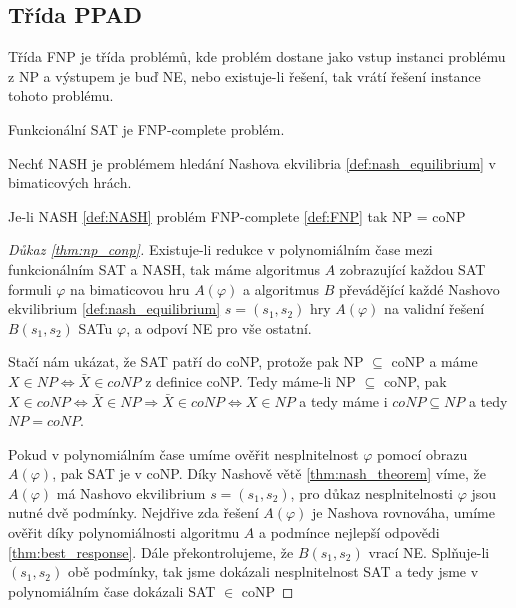 \subsection{Třída PPAD}
\begin{definition}
\label{def:FNP}
Třída FNP je třída problémů, kde problém dostane jako vstup instanci problému z NP a výstupem je buď NE, nebo existuje-li řešení, tak vrátí řešení instance tohoto problému. 

Funkcionální SAT je FNP-complete problém. 
\end{definition}
\begin{definition}\label{def:NASH}
Nechť NASH je problémem hledání Nashova ekvilibria \ref{def:nash_equilibrium} v bimaticových hrách. 
\end{definition}

\begin{theorem}
\label{thm:np_conp}
Je-li NASH \ref{def:NASH} problém FNP-complete \ref{def:FNP} tak NP = coNP
\end{theorem}
\begin{proof}[Důkaz \ref{thm:np_conp}]
    Existuje-li redukce v polynomiálním čase mezi funkcionálním SAT a NASH, tak máme algoritmus $A$ zobrazující každou SAT formuli $\varphi$ na bimaticovou hru $A(\varphi)$ a algoritmus $B$ převádějící každé Nashovo ekvilibrium \ref{def:nash_equilibrium} $s = (s_1, s_2)$ hry $A(\varphi)$ na validní řešení $B(s_1,s_2)$ SATu $\varphi$, a odpoví NE pro vše ostatní.


    Stačí nám ukázat, že SAT patří do coNP, protože pak NP $\subseteq$ coNP a máme $X \in NP \iff \bar{X} \in coNP$ z definice coNP. 
    Tedy máme-li NP $\subseteq$ coNP, pak $X \in coNP \iff \bar{X} \in NP \Rightarrow \bar{X} \in coNP \iff X \in NP$ a tedy máme i $coNP \subseteq NP$ a tedy $NP = coNP$. 

    Pokud v polynomiálním čase umíme ověřit nesplnitelnost $\varphi$ pomocí obrazu $A(\varphi)$, pak SAT je v coNP. 
    Díky Nashově větě \ref{thm:nash_theorem} víme, že $A(\varphi)$ má Nashovo ekvilibrium $s = (s_1, s_2)$, pro důkaz nesplnitelnosti $\varphi$ jsou nutné dvě podmínky.
    Nejdřive zda řešení $A(\varphi)$ je Nashova rovnováha, umíme ověřit díky polynomiálnosti algoritmu $A$ a podmínce nejlepší odpovědi \ref{thm:best_response}.
    Dále překontrolujeme, že $B(s_1, s_2)$ vrací NE. 
    Splňuje-li $(s_1,s_2)$ obě podmínky, tak jsme dokázali nesplnitelnost SAT a tedy jsme v polynomiálním čase dokázali SAT $\in$ coNP
\end{proof}

